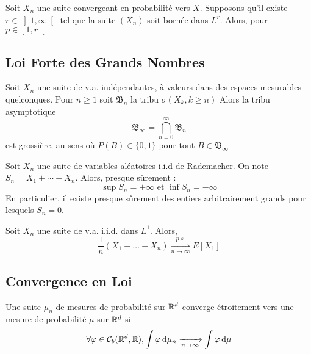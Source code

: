 \documentclass{cours}
\begin{document}
\begin{proposition}
    Soit $X_{n}$ une suite convergeant en probabilité vers $X$. Supposons qu'il existe $r \in \left]1, \infty \right[$ tel que la suite $(X_{n})$ soit bornée dans $L^{r}$. Alors, pour $p \in \left[1, r\right[$
\end{proposition}

\subsection{Loi Forte des Grands Nombres}
\begin{theorem}
    Soit $X_{n}$ une suite de v.a. indépendantes, à valeurs dans des espaces mesurables quelconques. Pour $n \geq 1$ soit $\mathfrak{B}_{n}$ la tribu $\sigma(X_{k}, k\geq n)$
    Alors la tribu asymptotique \[\mathfrak{B}_{\infty} = \bigcap_{n = 0}^{\infty} \mathfrak{B}_{n}\] est grossière, au sens où $P(B) \in \{0, 1\}$ pour tout $B \in \mathfrak{B}_{\infty}$
\end{theorem}

\begin{proposition}
    Soit $X_{n}$ une suite de variables aléatoires i.i.d de Rademacher. On note $S_{n} = X_{1} + \cdots + X_{n}$. Alors, presque sûrement : 
    \[  
        \sup S_{n} = +\infty \text{ et } \inf S_{n} = -\infty
    \]
    En particulier, il existe presque sûrement des entiers arbitrairement grands pour lesquels $S_{n} = 0$.
\end{proposition}

\begin{theorem}
    Soit $X_{n}$ une suite de v.a. i.i.d. dans $L^{1}$. Alors, 
    \[
        \frac{1}{n}\left(X_{1} + \ldots + X_{n}\right) \xrightarrow[n \to \infty]{p.s.} E[X_{1}]
    \]
\end{theorem}

\subsection{Convergence en Loi}
\begin{definition}
    Une suite $\mu_{n}$ de mesures de probabilité sur $\mathbb{R}^{d}$ converge étroitement vers une mesure de probabilité $\mu$ sur $\mathbb{R}^{d}$ si
    \[
        \forall \varphi \in \mathcal{C}_{b}(\mathbb{R}^{d}, \mathbb{R}), \int \varphi {\rm \, d}\mu_{n} \xrightarrow[n \to \infty]{} \int \varphi {\rm \, d}\mu
    \]
\end{definition}
\end{document}
